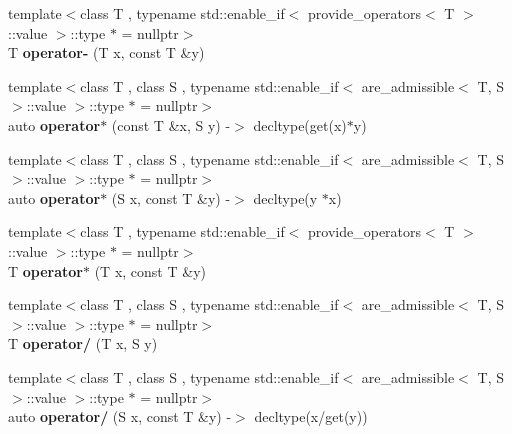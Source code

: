 \begin{DoxyCompactItemize}
\item 
{\footnotesize template$<$class T , typename std\+::enable\+\_\+if$<$ provide\+\_\+operators$<$ T $>$\+::value $>$\+::type $\ast$  = nullptr$>$ }\\T {\bfseries operator-\/} (T x, const T \&y)\hypertarget{namespaceSpacy_1_1Mixin_add1dbda74b031450f9185d1c5d953053}{}\label{namespaceSpacy_1_1Mixin_add1dbda74b031450f9185d1c5d953053}

\item 
{\footnotesize template$<$class T , class S , typename std\+::enable\+\_\+if$<$ are\+\_\+admissible$<$ T, S $>$\+::value $>$\+::type $\ast$  = nullptr$>$ }\\auto {\bfseries operator$\ast$} (const T \&x, S y) -\/$>$ decltype(get(x)$\ast$y)\hypertarget{namespaceSpacy_1_1Mixin_afe39485e968338e160eba0ba6890184e}{}\label{namespaceSpacy_1_1Mixin_afe39485e968338e160eba0ba6890184e}

\item 
{\footnotesize template$<$class T , class S , typename std\+::enable\+\_\+if$<$ are\+\_\+admissible$<$ T, S $>$\+::value $>$\+::type $\ast$  = nullptr$>$ }\\auto {\bfseries operator$\ast$} (S x, const T \&y) -\/$>$ decltype(y $\ast$x)\hypertarget{namespaceSpacy_1_1Mixin_a44774a9c71e9fb5ddef14e1ec990704d}{}\label{namespaceSpacy_1_1Mixin_a44774a9c71e9fb5ddef14e1ec990704d}

\item 
{\footnotesize template$<$class T , typename std\+::enable\+\_\+if$<$ provide\+\_\+operators$<$ T $>$\+::value $>$\+::type $\ast$  = nullptr$>$ }\\T {\bfseries operator$\ast$} (T x, const T \&y)\hypertarget{namespaceSpacy_1_1Mixin_a9374d1cc530ff5071d6fbe8c0db570a9}{}\label{namespaceSpacy_1_1Mixin_a9374d1cc530ff5071d6fbe8c0db570a9}

\item 
{\footnotesize template$<$class T , class S , typename std\+::enable\+\_\+if$<$ are\+\_\+admissible$<$ T, S $>$\+::value $>$\+::type $\ast$  = nullptr$>$ }\\T {\bfseries operator/} (T x, S y)\hypertarget{namespaceSpacy_1_1Mixin_aa1143f7efd6ea450abf4cd0f5947cb91}{}\label{namespaceSpacy_1_1Mixin_aa1143f7efd6ea450abf4cd0f5947cb91}

\item 
{\footnotesize template$<$class T , class S , typename std\+::enable\+\_\+if$<$ are\+\_\+admissible$<$ T, S $>$\+::value $>$\+::type $\ast$  = nullptr$>$ }\\auto {\bfseries operator/} (S x, const T \&y) -\/$>$ decltype(x/get(y))\hypertarget{namespaceSpacy_1_1Mixin_a0700a640b80373db0c27f405c7e52e9f}{}\label{namespaceSpacy_1_1Mixin_a0700a640b80373db0c27f405c7e52e9f}


\end{DoxyCompactItemize}
